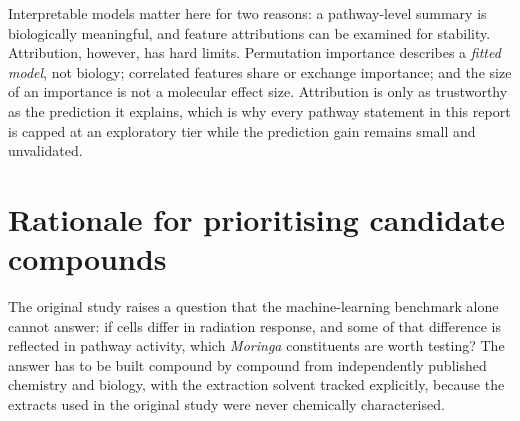 Interpretable models matter here for two reasons: a pathway-level summary is biologically
meaningful, and feature attributions can be examined for stability. Attribution, however,
has hard limits. Permutation importance describes a \emph{fitted model}, not biology;
correlated features share or exchange importance; and the size of an importance is not a
molecular effect size. Attribution is only as trustworthy as the prediction it explains,
which is why every pathway statement in this report is capped at an exploratory tier while
the prediction gain remains small and unvalidated.

\section{Rationale for prioritising candidate compounds}

The original study raises a question that the machine-learning benchmark alone cannot
answer: if cells differ in radiation response, and some of that difference is reflected in
pathway activity, which \textit{Moringa} constituents are worth testing? The answer has to be
built compound by compound from independently published chemistry and biology, with the
extraction solvent tracked explicitly, because the extracts used in the original study were
never chemically characterised.
